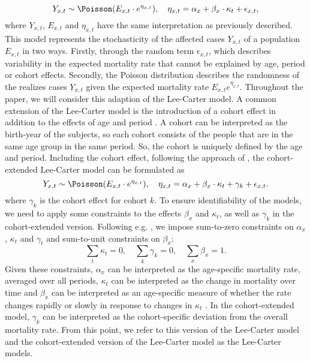 \begin{equation}
Y_{x,t} \sim \Poisson(E_{x,t}\cdot e^{\eta_{x,t}}), \quad \eta_{x,t}= \alpha_x + \beta_x\cdot\kappa_t + \epsilon_{x,t},
\label{eq:LC-model}
\end{equation}
where $Y_{x,t}$, $E_{x,t}$ and $\eta_{x,t}$ have the same interpretation as previously described. This model represents the stochasticity of the affected cases $Y_{x,t}$ of a population $E_{x,t}$ in two ways. Firstly, through the random term $\epsilon_{x,t}$, which describes variability in the expected mortality rate that cannot be explained by age, period or cohort effects. Secondly, the Poisson distribution describes the randomness of the realizes cases $Y_{x,t}$ given the expected mortality rate $E_{x,t}e^{\eta_{x,t}}$. Throughout the paper, we will consider this adaption of the Lee-Carter model. 
\newpar A common extension of the Lee-Carter model is the introduction of a cohort effect in addition to the effects of age and period \parencite{Wisniowski2015}. A cohort can be interpreted as the birth-year of the subjects, so each cohort consists of the people that are in the same age group in the same period. So, the cohort is uniquely defined by the age and period. Including the cohort effect, following the approach of \textcite{Wisniowski2015}, the cohort-extended Lee-Carter model can be formulated as
\begin{equation}
    Y_{x,t} \sim \Poisson(E_{x,t}\cdot e^{\eta_{x,t}}), \quad \eta_{x,t} = \alpha_x + \beta_x \cdot \kappa_t + \gamma_k + \epsilon_{x,t}.
    \label{eq:LCC-model-orig}
\end{equation}
where $\gamma_k$ is the cohort effect for cohort $k$. 
To ensure identifiability of the models, we need to apply some constraints to the effects $\beta_x$ and $\kappa_t$, as well as $\gamma_k$ in the cohort-extended version. Following e.g. \textcite{LeeCarter1992}, we impose sum-to-zero constraints on $\alpha_x$, $\kappa_t$ and $\gamma_t$ and sum-to-unit constraints on $\beta_x$:
\begin{equation}
    \sum_t\kappa_t = 0,\quad \sum_k\gamma_k = 0, \quad \sum_x\beta_x = 1.
    \label{eq:LC-constraints}    
\end{equation}
Given these constraints, $\alpha_x$ can be interpreted as the age-specific mortality rate, averaged over all periods, $\kappa_t$ can be interpreted as the change in mortality over time and $\beta_x$ can be interpreted as an age-specific measure of whether the rate changes rapidly or slowly in response to changes in $\kappa_t$ \parencite{LeeCarter1992}. In the cohort-extended model, $\gamma_k$ can be interpreted as the cohort-specific deviation from the overall mortality rate. From this point, we refer to this version of the Lee-Carter model and the cohort-extended version of the Lee-Carter model as the Lee-Carter models. 
